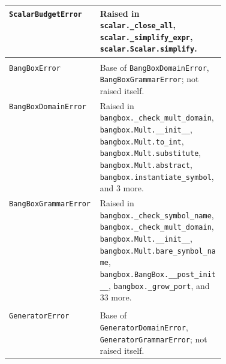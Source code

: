 {\begin{xltabular}{\linewidth}{@{}>{\raggedright\arraybackslash}p{0.42\linewidth}X@{}}
\texttt{ScalarBudgetError}\newline{} & Raised in \texttt{scalar.\allowbreak{}\_\allowbreak{}close\_\allowbreak{}all}, \texttt{scalar.\allowbreak{}\_\allowbreak{}simplify\_\allowbreak{}expr}, \texttt{scalar.\allowbreak{}Scalar.\allowbreak{}simplify}. \\
\midrule
{}\\*
\texttt{BangBoxError}\newline{} & Base of \texttt{BangBoxDomainError}, \texttt{BangBoxGrammarError}; not raised itself. \\
\texttt{BangBoxDomainError}\newline{} & Raised in \texttt{bangbox.\allowbreak{}\_\allowbreak{}check\_\allowbreak{}mult\_\allowbreak{}domain}, \texttt{bangbox.\allowbreak{}Mult.\allowbreak{}\_\allowbreak{}\_\allowbreak{}init\_\allowbreak{}\_\allowbreak{}}, \texttt{bangbox.\allowbreak{}Mult.\allowbreak{}to\_\allowbreak{}int}, \texttt{bangbox.\allowbreak{}Mult.\allowbreak{}substitute}, \texttt{bangbox.\allowbreak{}Mult.\allowbreak{}abstract}, \texttt{bangbox.\allowbreak{}instantiate\_\allowbreak{}symbol}, and 3 more. \\
\texttt{BangBoxGrammarError}\newline{} & Raised in \texttt{bangbox.\allowbreak{}\_\allowbreak{}check\_\allowbreak{}symbol\_\allowbreak{}name}, \texttt{bangbox.\allowbreak{}\_\allowbreak{}check\_\allowbreak{}mult\_\allowbreak{}domain}, \texttt{bangbox.\allowbreak{}Mult.\allowbreak{}\_\allowbreak{}\_\allowbreak{}init\_\allowbreak{}\_\allowbreak{}}, \texttt{bangbox.\allowbreak{}Mult.\allowbreak{}bare\_\allowbreak{}symbol\_\allowbreak{}name}, \texttt{bangbox.\allowbreak{}BangBox.\allowbreak{}\_\allowbreak{}\_\allowbreak{}post\_\allowbreak{}init\_\allowbreak{}\_\allowbreak{}}, \texttt{bangbox.\allowbreak{}\_\allowbreak{}grow\_\allowbreak{}port}, and 33 more. \\
\midrule
{}\\*
\texttt{GeneratorError}\newline{} & Base of \texttt{GeneratorDomainError}, \texttt{GeneratorGrammarError}; not raised itself. \\

\end{xltabular}}
